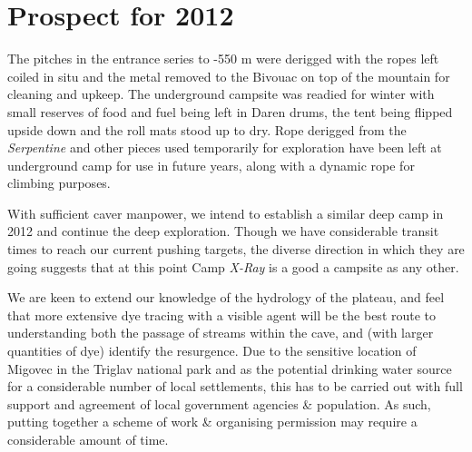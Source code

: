 \section{Prospect for 2012}

The pitches in the entrance series to -550 m were derigged with the
ropes left coiled in situ and the metal removed to the Bivouac on top of
the mountain for cleaning and upkeep. The underground campsite was
readied for winter with small reserves of food and fuel being left in
Daren drums, the tent being flipped upside down and the roll mats stood
up to dry. Rope derigged from the \emph{Serpentine} and other pieces
used temporarily for exploration have been left at underground camp for
use in future years, along with a dynamic rope for climbing purposes.

With sufficient caver manpower, we intend to establish a similar deep
camp in 2012 and continue the deep exploration. Though we have
considerable transit times to reach our current pushing targets, the
diverse direction in which they are going suggests that at this point
Camp \emph{X-Ray} is a good a campsite as any other.

We are keen to extend our knowledge of the hydrology of the plateau, and
feel that more extensive dye tracing with a visible agent will be the
best route to understanding both the passage of streams within the cave,
and (with larger quantities of dye) identify the resurgence. Due to the
sensitive location of Migovec in the Triglav national park and as the
potential drinking water source for a considerable number of local
settlements, this has to be carried out with full support and agreement
of local government agencies \& population. As such, putting together a
scheme of work \& organising permission may require a considerable
amount of time.
